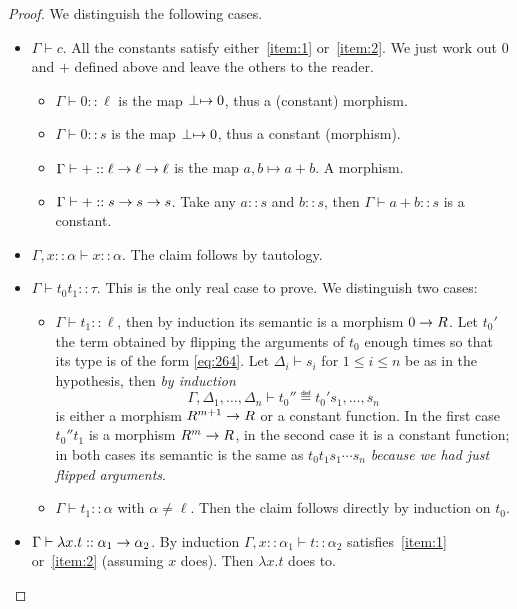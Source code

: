 \begin{proof}
  We distinguish the following cases.
  \begin{itemize}
  \item $\Gamma\vdash c$. All the constants satisfy either~\ref{item:1}
    or~\ref{item:2}. We just work out $0$ and $+$ defined above and
    leave the others to the reader. 
    \begin{itemize}
    \item $\Gamma\vdash0::\ell$ is the map $\perp\mapsto 0$, thus a
      (constant) morphism.
    \item $\Gamma\vdash0::s$ is the map $\perp\mapsto 0$, thus a constant
      (morphism).
    \item $\Gamma\vdash+::\ell\rightarrow\ell\rightarrow\ell$ is the map $a,b\mapsto
      a+b$. A morphism.
    \item $\Gamma\vdash+::s\rightarrow s\rightarrow s$. Take any $a::s$ and $b::s$, then
      $\Gamma\vdash a+b::s$ is a constant.
    \end{itemize}
  \item $\Gamma,x::\alpha\vdash x::\alpha$. The claim follows by
    tautology.
  \item $\Gamma\vdash t_0t_1::\tau$. This is the only real case
    to prove. We distinguish two cases:
    \begin{itemize}
    \item $\Gamma\vdash t_1::\ell$, then by induction its semantic is
      a morphism $0\rightarrow R$. Let $t_0'$ the term obtained by flipping
      the arguments of $t_0$ enough times so that its type is of the
      form \eqref{eq:264}.  Let $\Delta_i\vdash s_i$ for $1\le i\le n$
      be as in the hypothesis, then \emph{by induction}
      \begin{equation}
        \label{eq:271}
        \Gamma,\Delta_1,\ldots,\Delta_n\vdash t_0''\eqdef t_0's_1,\ldots,s_n
      \end{equation}
      is either a morphism $R^{m+1}\rightarrow R$ or a constant function. In
      the first case $t_0''t_1$ is a morphism $R^m\rightarrow R$, in the
      second case it is a constant function; in both cases its
      semantic is the same as $t_0t_1s_1\cdots s_n$ \emph{because we had
      just flipped arguments}.
    \item $\Gamma\vdash t_1::\alpha$ with $\alpha\ne\ell$. Then the claim follows
      directly by induction on $t_0$.
    \end{itemize}
  \item $\Gamma\vdash \lambda x.t::\alpha_1\rightarrow\alpha_2$. By
    induction $\Gamma,x::\alpha_1\vdash t::\alpha_2$
    satisfies~\ref{item:1} or~\ref{item:2} (assuming $x$ does). Then
    $\lambda x.t$ does to.
  \end{itemize}
\end{proof}

